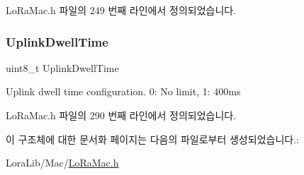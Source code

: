 Lo\+Ra\+Mac.\+h 파일의 249 번째 라인에서 정의되었습니다.

\mbox{\label{structs_lo_ra_mac_params_a0e6663762d6f9173bc8d8cb018f8f17a}} 
\subsubsection{\texorpdfstring{Uplink\+Dwell\+Time}{UplinkDwellTime}}
{\footnotesize\ttfamily uint8\+\_\+t Uplink\+Dwell\+Time}

Uplink dwell time configuration. 0\+: No limit, 1\+: 400ms 

Lo\+Ra\+Mac.\+h 파일의 290 번째 라인에서 정의되었습니다.



이 구조체에 대한 문서화 페이지는 다음의 파일로부터 생성되었습니다.\+:\begin{DoxyCompactItemize}
\item 
Lora\+Lib/\+Mac/\mbox{\hyperlink{_lo_ra_mac_8h}{Lo\+Ra\+Mac.\+h}}\end{DoxyCompactItemize}
